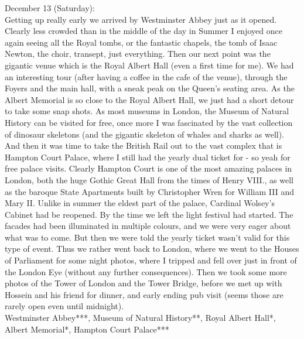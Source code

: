 December 13 (Saturday):\\
Getting up really early we arrived by Westminster Abbey just as it opened. Clearly less crowded than in the middle of the day in Summer I enjoyed once again seeing all the Royal tombs, or the fantastic chapels, the tomb of Isaac Newton, the choir, transept, just everything. Then our next point was the gigantic venue which is the Royal Albert Hall (even a first time for me). We had an interesting tour (after having a coffee in the cafe of the venue), through the Foyers and the main hall, with a sneak peak on the Queen's seating area. As the Albert Memorial is so close to the Royal Albert Hall, we just had a short detour to take some snap shots. As most museums in London, the Museum of Natural History can be visited for free, once more I was fascinated by the vast collection of dinosaur skeletons (and the gigantic skeleton of whales and sharks as well).  And then it was time to take the British Rail out to the vast complex that is Hampton Court Palace, where I still had the yearly dual ticket for - so yeah for free palace visits. Clearly Hampton Court is one of the most amazing palaces in London, both the huge Gothic Great Hall from the times of Henry VIII., as well as the baroque State Apartments built by Christopher Wren for William III and Mary II. Unlike in summer the eldest part of the palace, Cardinal Wolsey's Cabinet had be reopened. By the time we left the light festival had started. The facades had been illuminated in multiple colours, and we were very eager about what was to come. But then we were told the yearly ticket wasn't valid for this type of event. Thus we rather went back to London, where we went to the Houses of Parliament for some night photos, where I tripped and fell over just in front of the London Eye (without any further consequences). Then we took some more photos of the Tower of London and the Tower Bridge, before we met up with Hossein and his friend for dinner, and early ending pub visit (seems those are rarely open even until midnight).\\

Westminster Abbey***, Museum of Natural History**, Royal Albert Hall*, Albert Memorial*, Hampton Court Palace***\\

